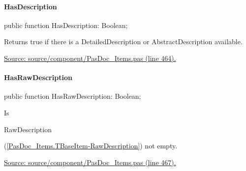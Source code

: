 \documentclass{report}
\newif\ifpdf
\begin{document}
\paragraph*{HasDescription}\hspace*{\fill}

\label{PasDoc_Items.TPasItem-HasDescription}
\begin{list}{}{
\setlength{\itemindent}{0cm}
\setlength{\listparindent}{0cm}
\setlength{\leftmargin}{\evensidemargin}
\addtolength{\leftmargin}{\tmplength}
\settowidth{\labelsep}{X}
\addtolength{\leftmargin}{\labelsep}
\setlength{\labelwidth}{\tmplength}
}
\item[\textbf{Declaration}\hfill]
\ifpdf
\begin{flushleft}
\fi
\begin{ttfamily}
public function HasDescription: Boolean;\end{ttfamily}

\ifpdf
\end{flushleft}
\fi

\par
\item[\textbf{Description}]
Returns true if there is a DetailedDescription or AbstractDescription available.\par
\href{https://github.com/pasdoc/pasdoc/blob/master/source/component/PasDoc_Items.pas#L464}{Source: source/component/PasDoc{\_}Items.pas (line 464).}

\end{list}
\paragraph*{HasRawDescription}\hspace*{\fill}

\label{PasDoc_Items.TPasItem-HasRawDescription}
\begin{list}{}{
\setlength{\itemindent}{0cm}
\setlength{\listparindent}{0cm}
\setlength{\leftmargin}{\evensidemargin}
\addtolength{\leftmargin}{\tmplength}
\settowidth{\labelsep}{X}
\addtolength{\leftmargin}{\labelsep}
\setlength{\labelwidth}{\tmplength}
}
\item[\textbf{Declaration}\hfill]
\ifpdf
\begin{flushleft}
\fi
\begin{ttfamily}
public function HasRawDescription: Boolean;\end{ttfamily}

\ifpdf
\end{flushleft}
\fi

\par
\item[\textbf{Description}]
Is \begin{ttfamily}RawDescription\end{ttfamily}(\ref{PasDoc_Items.TBaseItem-RawDescription}) not empty.\par
\href{https://github.com/pasdoc/pasdoc/blob/master/source/component/PasDoc_Items.pas#L467}{Source: source/component/PasDoc{\_}Items.pas (line 467).}

\end{list}
\end{document}
